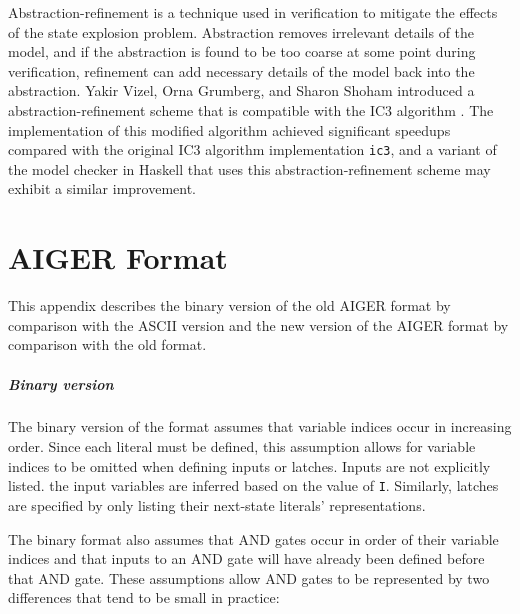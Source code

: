 \documentclass[12pt,a4paper,twoside,openright]{report}
\begin{document}
{Abstraction-refinement is a technique used in verification to mitigate the effects
of the state explosion problem. Abstraction removes irrelevant details of the model,
and if the abstraction is found to be too coarse at some point during verification,
refinement can add necessary details of the model back into the abstraction.
Yakir Vizel, Orna Grumberg, and Sharon Shoham introduced a abstraction-refinement
scheme that is compatible with the IC3 algorithm \cite{vizel12}. The implementation
of this modified algorithm achieved significant speedups compared with the
original IC3 algorithm implementation \verb,ic3,, and a variant
of the model checker in Haskell that uses this abstraction-refinement scheme may 
exhibit a similar improvement.



\appendix

\chapter{AIGER Format}
\label{aiger}
This appendix describes the binary version of the old AIGER format by comparison
with the ASCII version and the new version of the AIGER format by
comparison with the old format.

\paragraph{Binary version}{
The binary version of the format assumes that variable indices
occur in increasing order. Since each literal must be defined, this assumption
allows for variable indices to be omitted when defining inputs or latches.
Inputs are not explicitly listed. the input variables are inferred based on
the value of \verb,I,.
Similarly, latches are specified by only listing their next-state literals'
representations.

The binary format also assumes that AND gates occur in order of their
variable indices and that inputs to an AND gate will
have already been defined before that AND gate.
These assumptions allow AND gates to be represented by two differences
that tend to be small in practice:

}}
\end{document}
